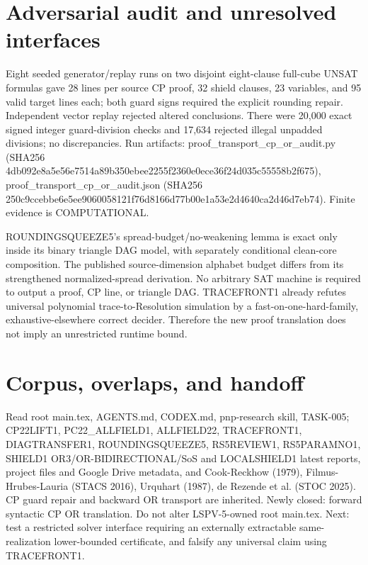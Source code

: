 \documentclass{article}
\begin{document}
\section{Adversarial audit and unresolved interfaces}
Eight seeded generator/replay runs on two disjoint eight-clause full-cube UNSAT formulas gave 28 lines per source CP proof, 32 shield clauses, 23 variables, and 95 valid target lines each; both guard signs required the explicit rounding repair. Independent vector replay rejected altered conclusions. There were 20,000 exact signed integer guard-division checks and 17,634 rejected illegal unpadded divisions; no discrepancies. Run artifacts: proof_transport_cp_or_audit.py (SHA256 4db092e8a5e56e7514a89b350ebee2255f2360e0ece36f24d035c55558b2f675), proof_transport_cp_or_audit.json (SHA256 250c9ccebbe6e5ee9060058121f76d8166d77b00e1a53e2d4640ca2d46d7eb74). Finite evidence is COMPUTATIONAL.
\par\noindent ROUNDINGSQUEEZE5's spread-budget/no-weakening lemma is exact only inside its binary triangle DAG model, with separately conditional clean-core composition. The published source-dimension alphabet budget differs from its strengthened normalized-spread derivation. No arbitrary SAT machine is required to output a proof, CP line, or triangle DAG. TRACEFRONT1 already refutes universal polynomial trace-to-Resolution simulation by a fast-on-one-hard-family, exhaustive-elsewhere correct decider. Therefore the new proof translation does not imply an unrestricted runtime bound.
\section{Corpus, overlaps, and handoff}
Read root main.tex, AGENTS.md, CODEX.md, pnp-research skill, TASK-005; CP22LIFT1, PC22_ALLFIELD1, ALLFIELD22, TRACEFRONT1, DIAGTRANSFER1, ROUNDINGSQUEEZE5, RS5REVIEW1, RS5PARAMNO1, SHIELD1 OR3/OR-BIDIRECTIONAL/SoS and LOCALSHIELD1 latest reports, project files and Google Drive metadata, and Cook-Reckhow (1979), Filmus-Hrubes-Lauria (STACS 2016), Urquhart (1987), de Rezende et al. (STOC 2025). CP guard repair and backward OR transport are inherited. Newly closed: forward syntactic CP OR translation. Do not alter LSPV-5-owned root main.tex. Next: test a restricted solver interface requiring an externally extractable same-realization lower-bounded certificate, and falsify any universal claim using TRACEFRONT1.
\end{document}
